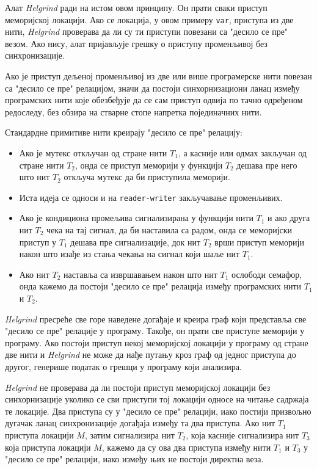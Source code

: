 \documentclass[12pt,oneside]{memoir}
\begin{document}
\indent Алат \textit{Helgrind} ради на истом овом принципу. Он прати сваки приступ меморијској локацији. Ако се локација, у овом примеру \texttt{var}, приступа из две нити, \textit{Helgrind} проверава да ли су ти приступи повезани са "десило се пре" везом. Ако нису, алат пријављује грешку о приступу променљивој без синхронизације.

\indent Ако је приступ дељеној променљивој из две или више програмерске нити повезан са "десило се пре" релацијом, значи да постоји синхорнизациони ланац између програмских нити које обезбеђује да се сам приступ одвија по тачно одређеном редоследу, без обзира на стварне стопе напретка појединачних нити.

\indent Стандардне примитиве нити креирају "десило се пре" релацију:
\begin{itemize}
  \item Ако је мутекс откључан од стране нити $T_1$, а касније или одмах закључан од стране нити $T_2$, онда се приступ меморији у функцији $T_2$ дешава пре него што нит  $T_2$ откључа мутекс да би приступила меморији.
  \item Иста идеја се односи и на \texttt{reader-writer} закључавање променљивих.
  \item Ако је кондициона промељива сигнализирана у функцији нити $T_1$ и ако друга нит $T_2$ чека на тај сигнал, да би наставила са радом, онда се меморијски приступ у $T_1$ дешава пре сигнализације, док нит $T_2$ врши приступ меморији након што изађе из стања чекања на сигнал који шаље нит $T_1$.
  \item Ако нит $T_2$ наставља са извршавањем након што нит $T_1$ ослободи семафор, онда кажемо да постоји "десило се пре" релација између програмских нити $T_1$ и $T_2$.
\end{itemize}

\indent \textit{Helgrind} пресреће све горе наведене догађаје и креира граф који представља све "десило се пре" релације у програму. Такође, он прати све приступе меморији у програму. Ако постоји приступ некој меморијској локацији у програму од стране две нити и \textit{Helgrind} не може да нађе путању кроз граф од једног приступа до другог, генерише податак о грешци у програму који анализира.

\indent \textit{Helgrind} не проверава да ли постоји приступ меморијској локацији без синхорнизације уколико се сви приступи тој локацији односе на читање садржаја те локације. Два приступа су у "десило се пре" релацији, иако постији призвољно дугачак ланац синхронизације догађаја између та два приступа. Ако нит $T_1$ приступа локацији $M$, затим сигнализира нит $T_2$, која касније сигнализира нит $T_3$ која приступа локацији $M$, кажемо да су ова два приступа између нити $T_1$ и $T_3$ у "десило се пре" релацији, иако између њих не постоји директна веза.
\end{document}
